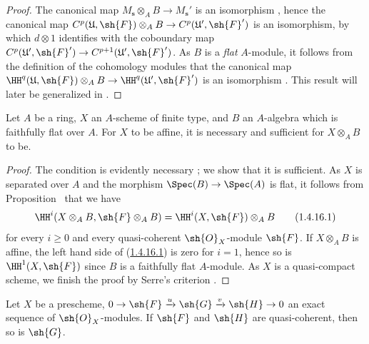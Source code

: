 \begin{proof}
The canonical map $M_\mathbf{s}\otimes_A B\to M_\mathbf{s}'$ is an isomorphism , hence the canonical map $C^p(\mathfrak{U},\sh{F})\otimes_A B\to C^p(\mathfrak{U}',\sh{F}')$ is an isomorphism, by which $d\otimes 1$ identifies with the coboundary map $C^p(\mathfrak{U}',\sh{F}')\to C^{p+1}(\mathfrak{U}',\sh{F}')$.
As $B$ is a \emph{flat} $A$-module, it follows from the definition of the cohomology modules that the canonical map $\HH^q(\mathfrak{U},\sh{F})\otimes_A B\to\HH^q(\mathfrak{U}',\sh{F}')$ is an isomorphism .
This result will later be generalized in \hyperref[section:III.6]{}.
\end{proof}

\begin{corollary}[1.4.16]
\label{III.1.4.16}
Let $A$ be a ring, $X$ an $A$-scheme of finite type, and $B$ an $A$-algebra which is faithfully flat over $A$.
For $X$ to be affine, it is necessary and sufficient for $X\otimes_A B$ to be.
\end{corollary}

\begin{proof}
The condition is evidently necessary ; we show that it is sufficient.
As $X$ is separated over $A$ and the morphism $\Spec(B)\to\Spec(A)$ is flat, it follows from Proposition~ that we have
\[
\label{III.1.4.16.1}
  \HH^i(X\otimes_A B,\sh{F}\otimes_A B)=\HH^i(X,\sh{F})\otimes_A B
  \tag{1.4.16.1}
\]
for every $i\geq 0$ and every quasi-coherent $\sh{O}_X$-module $\sh{F}$.
If $X\otimes_A B$ is affine, the left hand side of (\hyperref[III.1.4.16.1]{1.4.16.1}) is zero for $i=1$, hence so is $\HH^1(X,\sh{F})$ since $B$ is a faithfully flat $A$-module.
As $X$ is a quasi-compact scheme, we finish the proof by Serre's criterion .
\end{proof}

\begin{proposition}[1.4.17]
\label{III.1.4.17}
Let $X$ be a prescheme, $0\to\sh{F}\xrightarrow{u}\sh{G}\xrightarrow{v}\sh{H}\to 0$ an exact sequence of $\sh{O}_X$-modules.
If $\sh{F}$ and $\sh{H}$ are quasi-coherent, then so is $\sh{G}$.
\end{proposition}

